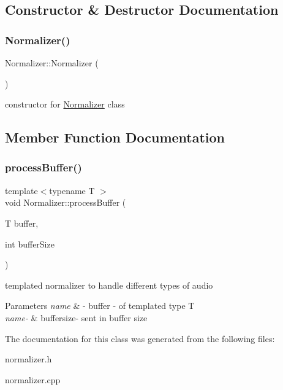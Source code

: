 \subsection{Constructor \& Destructor Documentation}
\mbox{\label{classNormalizer_af576151323854ff0d4d7e37255c397d1}} 
\subsubsection{\texorpdfstring{Normalizer()}{Normalizer()}}
{\footnotesize\ttfamily Normalizer\+::\+Normalizer (\begin{DoxyParamCaption}{ }\end{DoxyParamCaption})}

constructor for \hyperlink{classNormalizer}{Normalizer} class 

\subsection{Member Function Documentation}
\mbox{\label{classNormalizer_aaef27fc4d06b2d51a1c17e349ca9ab85}} 
\subsubsection{\texorpdfstring{process\+Buffer()}{processBuffer()}}
{\footnotesize\ttfamily template$<$typename T $>$ \\
void Normalizer\+::process\+Buffer (\begin{DoxyParamCaption}\item[{T}]{buffer,  }\item[{int}]{buffer\+Size }\end{DoxyParamCaption})\hspace{0.3cm}{\ttfamily [inline]}}

templated normalizer to handle different types of audio 
\begin{DoxyParams}{Parameters}
{\em name} & -\/ buffer -\/ of templated type T \\
\hline
{\em name-\/} & buffersize-\/ sent in buffer size \\
\hline
\end{DoxyParams}


The documentation for this class was generated from the following files\+:\begin{DoxyCompactItemize}
\item 
normalizer.\+h\item 
normalizer.\+cpp\end{DoxyCompactItemize}
